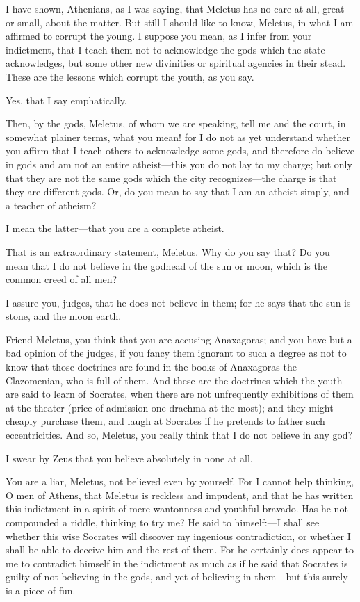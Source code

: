 \documentclass[12pt]{article}
\begin{document}
I have shown, Athenians, as I was saying, that Meletus has no care
at all, great or small, about the matter. But still I should like
to know, Meletus, in what I am affirmed to corrupt the young. I suppose
you mean, as I infer from your indictment, that I teach them not to
acknowledge the gods which the state acknowledges, but some other
new divinities or spiritual agencies in their stead. These are the
lessons which corrupt the youth, as you say.

Yes, that I say emphatically.

Then, by the gods, Meletus, of whom we are speaking, tell me and the
court, in somewhat plainer terms, what you mean! for I do not as yet
understand whether you affirm that I teach others to acknowledge some
gods, and therefore do believe in gods and am not an entire atheist---this you
do not lay to my charge; but only that they are not the same gods which the
city recognizes---the charge is that they are
different gods. Or, do you mean to say that I am an atheist simply,
and a teacher of atheism?

I mean the latter---that you are a complete atheist.

That is an extraordinary statement, Meletus. Why do you say that?
Do you mean that I do not believe in the godhead of the sun or moon,
which is the common creed of all men?

I assure you, judges, that he does not believe in them; for he says
that the sun is stone, and the moon earth.

Friend Meletus, you think that you are accusing Anaxagoras; and you
have but a bad opinion of the judges, if you fancy them ignorant to
such a degree as not to know that those doctrines are found in the
books of Anaxagoras the Clazomenian, who is full of them. And these
are the doctrines which the youth are said to learn of Socrates, when
there are not unfrequently exhibitions of them at the theater (price
of admission one drachma at the most); and they might cheaply purchase
them, and laugh at Socrates if he pretends to father such eccentricities.
And so, Meletus, you really think that I do not believe in any god?

I swear by Zeus that you believe absolutely in none at all.

You are a liar, Meletus, not believed even by yourself. For I cannot
help thinking, O men of Athens, that Meletus is reckless and impudent,
and that he has written this indictment in a spirit of mere wantonness
and youthful bravado. Has he not compounded a riddle, thinking to
try me? He said to himself:---I shall see whether this wise Socrates
will discover my ingenious contradiction, or whether I shall be able
to deceive him and the rest of them. For he certainly does appear
to me to contradict himself in the indictment as much as if he said
that Socrates is guilty of not believing in the gods, and yet of believing
in them---but this surely is a piece of fun.
\end{document}
